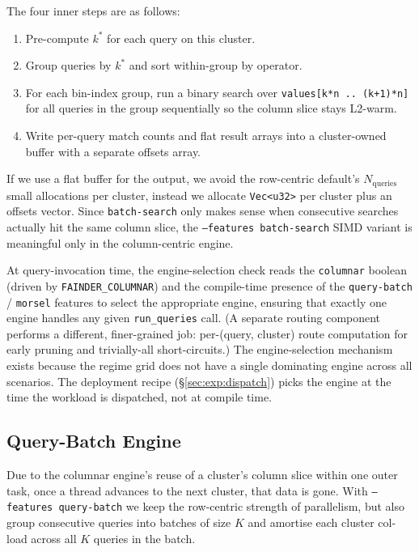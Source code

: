 The four inner steps are as follows:

\begin{enumerate}
    \item Pre-compute $k^*$ for each query on this cluster.
    \item Group queries by $k^*$ and sort within-group by operator.
    \item For each bin-index group, run a binary search over \texttt{values[k*n .. (k+1)*n]} for all queries in the group sequentially so the column slice stays L2-warm.
    \item Write per-query match counts and flat result arrays into a cluster-owned buffer with a separate offsets array.
\end{enumerate}

If we use a flat buffer for the output, we avoid the row-centric default's $N_\text{queries}$ small allocations per cluster, instead we allocate \texttt{Vec<u32>} per cluster plus an offsets vector. Since \texttt{batch-search} only makes sense when consecutive searches actually hit the same column slice, the \texttt{--features batch-search} SIMD variant is meaningful only in the column-centric engine.

At query-invocation time, the engine-selection check reads the \texttt{columnar} boolean (driven by \texttt{FAINDER\_COLUMNAR}) and the compile-time presence of the \texttt{query-batch} / \texttt{morsel} features to select the appropriate engine, ensuring that exactly one engine handles any given \texttt{run\_queries} call. (A separate routing component performs a different, finer-grained job: per-(query, cluster) route computation for early pruning and trivially-all short-circuits.) The engine-selection mechanism exists because the regime grid does not have a single dominating engine across all scenarios. The deployment recipe (§\ref{sec:exp:dispatch}) picks the engine at the time the workload is dispatched, not at compile time.

\subsection{Query-Batch Engine\label{sec:method:impl:qbatch}}

Due to the columnar engine's reuse of a cluster's column slice within one outer task, once a thread advances to the next cluster, that data is gone. With \texttt{--features query-batch} we keep the row-centric strength of parallelism, but also group consecutive queries into batches of size $K$ and amortise each cluster col-load across all $K$ queries in the batch.

